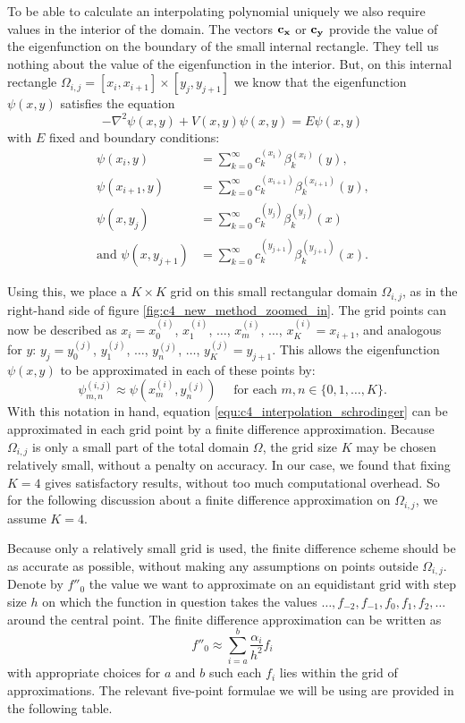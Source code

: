 To be able to calculate an interpolating polynomial uniquely we also require values in the interior of the domain. The vectors $\vb{c_x}$ or $\vb{c_y}$ provide the value of the eigenfunction on the boundary of the small internal rectangle. They tell us nothing about the value of the eigenfunction in the interior. But, on this internal rectangle $\Omega_{i, j} = [x_i, x_{i+1}] \times [y_j, y_{j+1}]$ we know that the eigenfunction $\psi(x, y)$ satisfies the equation
\begin{equation}\label{equ:c4_interpolation_schrodinger}
    -\nabla^2 \psi(x, y) + V(x, y) \psi(x, y) = E \psi(x, y)
\end{equation}
with $E$ fixed and boundary conditions:
\begin{align*}
    \psi(x_i, y)                 & = \sum_{k=0}^\infty c_k^{(x_i)} \beta_k^{(x_i)}(y)\text{,}          \\
    \psi(x_{i+1}, y)             & = \sum_{k=0}^\infty c_k^{(x_{i+1})} \beta_k^{(x_{i+1})}(y)\text{,}  \\
    \psi(x, y_j)                 & = \sum_{k=0}^\infty c_k^{(y_j)} \beta_k^{(y_j)}(x)                  \\
    \text{and } \psi(x, y_{j+1}) & = \sum_{k=0}^\infty c_k^{(y_{j+1})} \beta_k^{(y_{j+1})}(x) \text{.}
\end{align*}

Using this, we place a $K \times K$ grid on this small rectangular domain $\Omega_{i, j}$, as in the right-hand side of figure \ref{fig:c4_new_method_zoomed_in}. The grid points can now be described as $x_i = x^{(i)}_0$, $x^{(i)}_1$, $\dots$, $x^{(i)}_m$, $\dots$, $x^{(i)}_K = x_{i+1}$, and analogous for $y$: $y_j = y^{(j)}_0$, $y^{(j)}_1$, $\dots$, $y^{(j)}_n$, $\dots$, $y^{(j)}_K = y_{j+1}$. This allows the eigenfunction $\psi(x, y)$ to be approximated in each of these points by:
$$
    \psi^{(i,j)}_{m,n} \approx \psi(x^{(i)}_m, y^{(j)}_n) \quad \text{ for each $m, n \in \{0, 1, \dots, K\}$.}
$$
With this notation in hand, equation \ref{equ:c4_interpolation_schrodinger} can be approximated in each grid point by a finite difference approximation. Because $\Omega_{i,j}$ is only a small part of the total domain $\Omega$, the grid size $K$ may be chosen relatively small, without a penalty on accuracy. In our case, we found that fixing $K = 4$ gives satisfactory results, without too much computational overhead. So for the following discussion about a finite difference approximation on $\Omega_{i,j}$, we assume $K = 4$.

Because only a relatively small grid is used, the finite difference scheme should be as accurate as possible, without making any assumptions on points outside $\Omega_{i,j}$. Denote by $f''_0$ the value we want to approximate on an equidistant grid with step size $h$ on which the function in question takes the values $\dots, f_{-2}, f_{-1}, f_{0}, f_{1}, f_{2}, \dots$ around the central point. The finite difference approximation can be written as
$$
    f''_0 \approx \sum_{i = a}^{b} \frac{\alpha_i}{h^2} f_i
$$
with appropriate choices for $a$ and $b$ such each $f_i$ lies within the grid of approximations. The relevant five-point formulae we will be using are provided in the following table.

